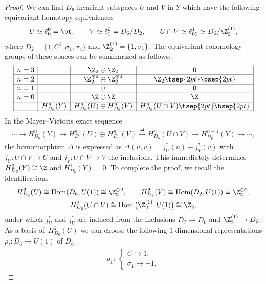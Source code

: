 \begin{proof}
We can f\/ind $D_6$-invariant subspaces $U$ and $V$ in $Y$ which have the following equivariant homotopy equivalences
\begin{gather*}
U \simeq \tilde{e}^0_0 = \pt, \qquad
V \simeq \tilde{e}^0_1 = D_6/D_2, \qquad
U \cap V \simeq \tilde{e}^1_{01} \simeq D_6/\Z_2^{(1)},
\end{gather*}
where $D_2 = \{ 1, C^3, \sigma_1, \sigma_4 \}$ and $\Z_2^{(1)} = \{ 1, \sigma_1 \}$. The equivariant cohomology groups of these spaces can be summarized as follows:
$$
\begin{array}{|c|c|c|c|}
\hline
n = 3 & & \Z_2 \oplus \Z_2 & 0 \\
\hline
n = 2 & & \Z_2^{\oplus 2} \oplus \Z_2^{\oplus 2} & \Z_2 \tsep{2pt}\bsep{2pt}\\
\hline
n = 1 & & 0 & 0 \\
\hline
n = 0 & & \Z \oplus \Z & \Z \\
\hline
& H^n_{D_6}(Y) & H^n_{D_6}(U) \oplus H^n_{D_6}(V) & H^n_{D_6}(U \cap V)\tsep{2pt}\bsep{2pt}\\
\hline
\end{array}
$$
In the Mayer--Vietoris exact sequence
\begin{gather*}
\cdots \to H^n_{D_6}(Y) \to H^n_{D_6}(U) \oplus H^n_{D_6}(V) \overset{\Delta}{\to} H^n_{D_6}(U \cap V) \to H^{n+1}_{D_6}(Y) \to \cdots,
\end{gather*}
the homomorphism $\Delta$ is expressed as $\Delta (u, v) = j_U^*(u) - j_V^*(v)$ with $j_U \colon U \cap V \to U$ and $j_V \colon U \cap V \to V$ the inclusions. This immediately determines $H^0_{D_6}(Y) \cong \Z$ and $H^1_{D_6}(Y) = 0$. To complete the proof, we recall the identif\/ications
\begin{gather*}
H^2_{D_6}(U) \cong \operatorname{Hom}(D_6, U(1)) \cong \Z_2^{\oplus 2}, \qquad
H^2_{D_6}(V) \cong \operatorname{Hom}(D_2, U(1)) \cong \Z_2^{\oplus 2}, \\
H^2_{D_6}(U \cap V) \cong \operatorname{Hom}\big(\Z_2^{(1)}, U(1)\big) \cong \Z_2,
\end{gather*}
under which $j_U^*$ and $j_V^*$ are induced from the inclusions $D_2 \to D_6$ and $\Z_2^{(1)} \to D_6$. As a basis of~$H^2_{D_6}(U)$ we can choose the following $1$-dimensional representations $\rho_i\colon D_6 \to U(1)$ of $D_6$
\begin{gather*}
\rho_1 \colon \
\begin{cases}
C \mapsto 1, \\
\sigma_1 \mapsto -1,
\end{cases}

\end{gather*}
\end{proof}
